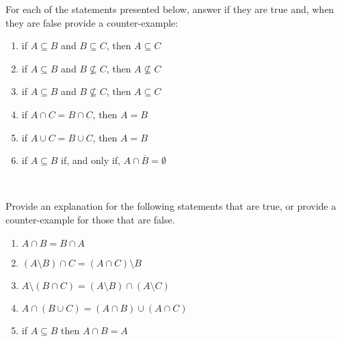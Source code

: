 \documentclass[11pt]{article}
\begin{document}
\begin{myExercise}
  For each of the statements presented below, answer if they are true and, when they are false provide a counter-example:
  \begin{enumerate}[label=(\alph*)]
  \item if $A \subseteq B$ and $B \subseteq C$, then $A \subseteq C$
  \item if $A \subseteq B$ and $B \not\subseteq C$, then $A \not\subseteq C$
  \item if $A \subseteq B$ and $B \not\subseteq C$, then $A \subseteq C$
  \item if $A \cap C = B \cap C$, then $A = B$
  \item if $A \cup C = B \cup C$, then $A = B$
  \item if $A \subseteq B$ if, and only if, $A \cap \overline{B} = \emptyset$
  \end{enumerate}

\end{myExercise}

~\\[-6mm]

\begin{myExercise}
  Provide an explanation for the following statements that are true, or provide a counter-example for those that are false.
  
  \begin{enumerate}[label=(\alph*)]
    \item $A \cap B = B \cap A$  
    \item $(A \setminus B) \cap C = (A \cap C) \setminus B$
    \item $A \setminus (B \cap C) = (A \setminus B) \cap (A \setminus C)$
    \item $A \cap (B \cup C) = (A \cap B) \cup (A \cap C)$
    \item if $A \subseteq B$ then $A \cap B = A$

  \end{enumerate}

\end{myExercise}


\end{document}
